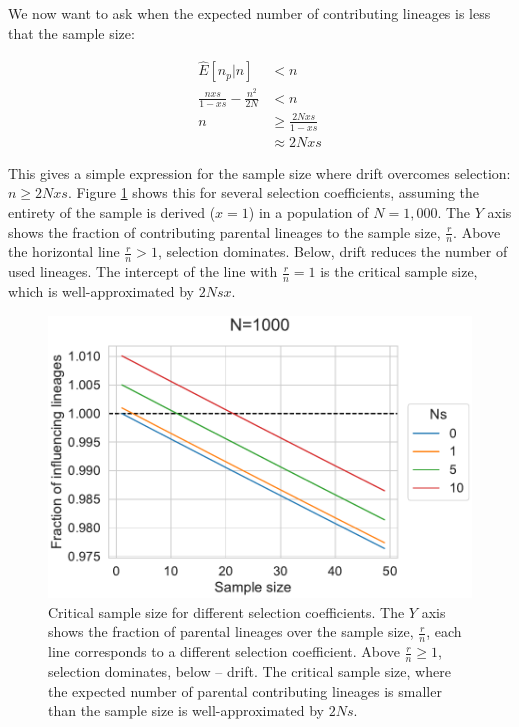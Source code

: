 \documentclass[review]{elsarticle}
\begin{document}
We now want to ask when the expected number of contributing lineages is less that the sample size:

\begin{equation*}
  \begin{aligned}
    \label{eq:critical-sample}
    \hat{E}[n_p | n] &< n \\
    \frac{nxs}{1-xs} - \frac{n^2}{2N} &< n \\
    n &\ge \frac{2Nxs}{1-xs} \\
                                       &\approx 2Nxs
  \end{aligned}
\end{equation*}

This gives a simple expression for the sample size where drift overcomes selection: $n \ge 2Nxs$.
Figure \ref{fig:critical-sample-size} shows this for several selection coefficients, assuming the
entirety of the sample is derived ($x=1$) in a population of $N=1,000$. The $Y$ axis shows the fraction of
contributing parental lineages to the sample size, $\frac{r}{n}$. Above the horizontal line
$\frac{r}{n} > 1$, selection dominates. Below, drift reduces the number of used lineages. The
intercept of the line with $\frac{r}{n} = 1$ is the critical sample size, which is well-approximated
by $2Nsx$.

\begin{figure}
  \centering
  \includegraphics{fig/critical_sample_size.pdf}
  \caption{Critical sample size for different selection coefficients. The $Y$ axis shows the
    fraction of parental lineages over the sample size, $\frac{r}{n}$, each line corresponds to a
    different selection coefficient. Above $\frac{r}{n}\ge 1$, selection dominates, below -- drift.
    The critical sample size, where the expected number of parental contributing lineages is smaller
    than the sample size is well-approximated by $2Ns$.}
  \label{fig:critical-sample-size}
\end{figure}
\end{document}
